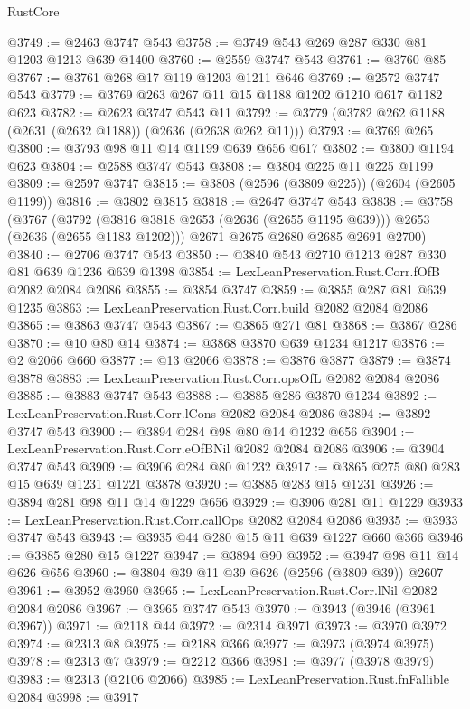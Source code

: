 \begin{lexlean}{RustCore}
\begin{coremodule}
@3749 := @2463 @3747 @543
@3758 := @3749 @543 @269 @287 @330 @81 @1203 @1213 @639 @1400
@3760 := @2559 @3747 @543
@3761 := @3760 @85
@3767 := @3761 @268 @17 @119 @1203 @1211 @646
@3769 := @2572 @3747 @543
@3779 := @3769 @263 @267 @11 @15 @1188 @1202 @1210 @617 @1182 @623
@3782 := @2623 @3747 @543 @11
@3792 := @3779 (@3782 @262 @1188 (@2631 (@2632 @1188)) (@2636 (@2638 @262 @11)))
@3793 := @3769 @265
@3800 := @3793 @98 @11 @14 @1199 @639 @656 @617
@3802 := @3800 @1194 @623
@3804 := @2588 @3747 @543
@3808 := @3804 @225 @11 @225 @1199
@3809 := @2597 @3747
@3815 := @3808 (@2596 (@3809 @225)) (@2604 (@2605 @1199))
@3816 := @3802 @3815
@3818 := @2647 @3747 @543
@3838 := @3758
    (@3767
      (@3792 (@3816 @3818 @2653 (@2636 (@2655 @1195 @639))) @2653 (@2636 (@2655 @1183 @1202)))
      @2671
      @2675
      @2680
      @2685
      @2691
      @2700)
@3840 := @2706 @3747 @543
@3850 := @3840 @543 @2710 @1213 @287 @330 @81 @639 @1236 @639 @1398
@3854 := LexLeanPreservation.Rust.Corr.fOfB @2082 @2084 @2086
@3855 := @3854 @3747
@3859 := @3855 @287 @81 @639 @1235
@3863 := LexLeanPreservation.Rust.Corr.build @2082 @2084 @2086
@3865 := @3863 @3747 @543
@3867 := @3865 @271 @81
@3868 := @3867 @286
@3870 := @10 @80 @14
@3874 := @3868 @3870 @639 @1234 @1217
@3876 := @2 @2066 @660
@3877 := @13 @2066
@3878 := @3876 @3877
@3879 := @3874 @3878
@3883 := LexLeanPreservation.Rust.Corr.opsOfL @2082 @2084 @2086
@3885 := @3883 @3747 @543
@3888 := @3885 @286 @3870 @1234
@3892 := LexLeanPreservation.Rust.Corr.lCons @2082 @2084 @2086
@3894 := @3892 @3747 @543
@3900 := @3894 @284 @98 @80 @14 @1232 @656
@3904 := LexLeanPreservation.Rust.Corr.eOfBNil @2082 @2084 @2086
@3906 := @3904 @3747 @543
@3909 := @3906 @284 @80 @1232
@3917 := @3865 @275 @80 @283 @15 @639 @1231 @1221 @3878
@3920 := @3885 @283 @15 @1231
@3926 := @3894 @281 @98 @11 @14 @1229 @656
@3929 := @3906 @281 @11 @1229
@3933 := LexLeanPreservation.Rust.Corr.callOps @2082 @2084 @2086
@3935 := @3933 @3747 @543
@3943 := @3935 @44 @280 @15 @11 @639 @1227 @660 @366
@3946 := @3885 @280 @15 @1227
@3947 := @3894 @90
@3952 := @3947 @98 @11 @14 @626 @656
@3960 := @3804 @39 @11 @39 @626 (@2596 (@3809 @39)) @2607
@3961 := @3952 @3960
@3965 := LexLeanPreservation.Rust.Corr.lNil @2082 @2084 @2086
@3967 := @3965 @3747 @543
@3970 := @3943 (@3946 (@3961 @3967))
@3971 := @2118 @44
@3972 := @2314 @3971
@3973 := @3970 @3972
@3974 := @2313 @8
@3975 := @2188 @366
@3977 := @3973 (@3974 @3975)
@3978 := @2313 @7
@3979 := @2212 @366
@3981 := @3977 (@3978 @3979)
@3983 := @2313 (@2106 @2066)
@3985 := LexLeanPreservation.Rust.fnFallible @2084
@3998 := @3917

\end{coremodule}
\end{lexlean}
